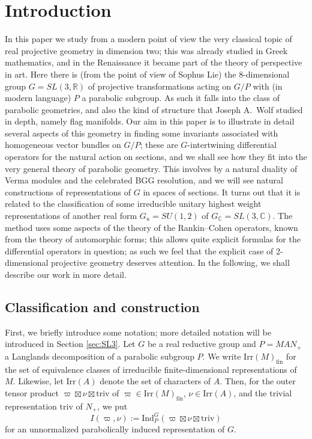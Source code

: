 \documentclass[reqno,11pt]{amsart}
\theoremstyle{remark}
\numberwithin{equation}{section}
\newcommand{\R}{\mathbb{R}}
\newcommand{\C}{\mathbb{C}}
\newcommand{\Ind}{\mathrm{Ind}}
\newcommand{\Irr}{\mathrm{Irr}}
\newcommand{\triv}{\mathrm{triv}}
\newcommand{\fin}{\mathrm{fin}}
\begin{document}

\section{Introduction}\label{sec:intro}


In this paper we study from a modern point of view the very classical topic of real projective geometry in dimension
two;  this was already studied in Greek mathematics, and in the Renaissance 
it became part of the theory of
perspective in art. Here there is (from the point of view of Sophus Lie) the 
8-dimensional group $G=SL(3,\R)$ of projective transformations
acting on $G/P$ with (in modern language) $P$ a parabolic subgroup. As such it falls into the class of parabolic geometries, and
also the kind of structure that Joseph A.\ Wolf studied in depth, namely flag manifolds. Our aim in this paper is to illustrate
in detail several aspects of this geometry in finding some invariants associated with homogeneous vector bundles
on $G/P$; these are $G$-intertwining differential operators for the natural action on sections, and we shall see how they fit
into the very general theory of parabolic geometry. This involves by a natural duality of Verma modules and the celebrated BGG resolution, and we will see natural constructions of representations of $G$ in spaces of sections.
It turns out that it is related to the classification of some irreducible unitary highest weight representations of another real form $G_u=SU(1,2)$ of $G_\C=SL(3,\C)$.
The method uses some aspects of the theory of the Rankin--Cohen operators, known from the theory of automorphic forms;
this allows quite explicit formulas for the differential operators in question; as such we feel that the explicit case of 2-dimensional
projective geometry deserves attention.
 In the following, we shall describe our work in more detail.

\subsection{Classification and construction}
First, we briefly introduce some notation;
more detailed notation will be introduced in Section \ref{sec:SL3}.
Let $G$ be a real reductive group and $P=MAN_+$ a Langlands 
decomposition of a parabolic subgroup $P$.
We write $\Irr(M)_\fin$ for the set of  equivalence classes of 
irreducible finite-dimensional representations of $M$.
Likewise, let $\Irr(A)$ denote the set of characters of $A$. 
Then, for the outer tensor product $\varpi\boxtimes \nu \boxtimes \triv$ 
of $\varpi \in \Irr(M)_\fin$, $\nu \in \Irr(A)$, and the trivial representation
$\triv$ of $N_+$, we put
\begin{equation*}
I(\varpi,\nu) := \Ind_{P}^G(\varpi\boxtimes \nu \boxtimes \triv)
\end{equation*}
for an unnormalized parabolically induced representation of $G$.
\end{document}
